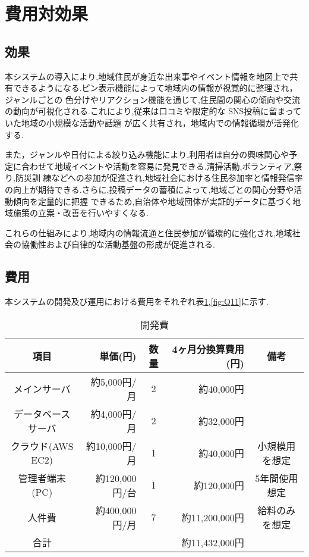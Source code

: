 \section{費用対効果}
\subsection{効果}
本システムの導入により,地域住民が身近な出来事やイベント情報を地図上で共有できるようになる.ピン表示機能によって地域内の情報が視覚的に整理され，ジャンルごとの
色分けやリアクション機能を通じて,住民間の関心の傾向や交流の動向が可視化される.これにより,従来は口コミや限定的な SNS投稿に留まっていた地域の小規模な活動や話題
が広く共有され，地域内での情報循環が活発化する.\par
また，ジャンルや日付による絞り込み機能により,利用者は自分の興味関心や予定に合わせて地域イベントや活動を容易に発見できる.清掃活動,ボランティア,祭り,防災訓
練などへの参加が促進され,地域社会における住民参加率と情報発信率の向上が期待できる.さらに,投稿データの蓄積によって,地域ごとの関心分野や活動傾向を定量的に把握
できるため,自治体や地域団体が実証的データに基づく地域施策の立案・改善を行いやすくなる. \par
これらの仕組みにより,地域内の情報流通と住民参加が循環的に強化され,地域社会の協働性および自律的な活動基盤の形成が促進される.

\subsection{費用}
本システムの開発及び運用における費用をそれぞれ表\ref{fig:Q10},\ref{fig:Q11}に示す.
\clearpage

\begin{table}[h]
  \centering
  \caption{開発費}
  \label{fig:Q10}
  \begin{tabular}{crcrc}
  \hline
  項目  & 単価(円) & 数量   & 4ヶ月分換算費用(円) & 備考\\ \hline\hline
  
メインサーバ  & 約5,000円/月 & 2  & 約40,000円&  \\ \hline

データベースサーバ & 約4,000円/月 & 2  & 約32,000円& \\\hline

クラウド(AWS EC2) &約10,000円/月 &1 & 約40,000円& 小規模用を想定\\ \hline

管理者端末(PC) & 約120,000円/台& 1& 約120,000円& 5年間使用想定 \\ \hline

人件費　 & 約400,000円/月 & 7& 約11,200,000円& 給料のみを想定\\ \hline\hline

合計　& & & 約11,432,000円\\ \hline
\end{tabular}
\end{table}



